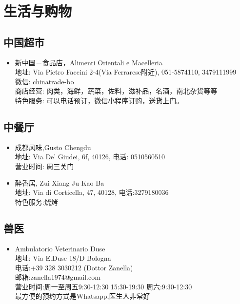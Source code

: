 \chapter{生活与购物}              



\section{中国超市}
\begin{itemize}
\item 新中国－食品店，Alimenti Orientali e Macelleria\\
地址: Via Pietro Faccini 2-4(Via Ferrarese附近), 051-5874110, 3479111999\\
微信: chinatrade-bo\\
商店经营: 肉类，海鲜，蔬菜，佐料，滋补品，名酒，南北杂货等等\\
特色服务: 可以电话预订，微信小程序订购，送货上门。
\end{itemize}

\section{中餐厅}
\begin{itemize}
\item 成都风味,Gusto Chengdu\\
地址: Via De' Giudei, 6f, 40126, 电话: 0510560510 \\
营业时间: 周三关门\\

\item 醉香居, Zui Xiang Ju Kao Ba\\
地址: Via di Corticella, 47, 40128, 电话:3279180036\\
特色服务:烧烤\\

\end{itemize}


\section{兽医}
\begin{itemize}
\item Ambulatorio Veterinario Duse\\
地址: Via E.Duse 18/D Bologna\\
电话:+39 328 3030212 (Dottor Zanella)\\
邮箱:zanella1974@gmail.com\\
营业时间:周一至周五9:30-12:30  15:30-19:30  周六:9:30-12:30\\
最方便的预约方式是Whatsapp,医生人非常好
\end{itemize}

